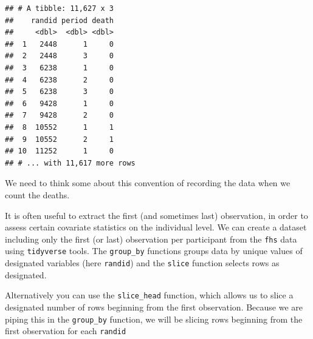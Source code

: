 \documentclass[
]{book}
\newenvironment{Shaded}{\begin{snugshade}}{\end{snugshade}}
\newcommand{\DataTypeTok}[1]{\textcolor[rgb]{0.13,0.29,0.53}{#1}}
\newcommand{\DecValTok}[1]{\textcolor[rgb]{0.00,0.00,0.81}{#1}}
\newcommand{\KeywordTok}[1]{\textcolor[rgb]{0.13,0.29,0.53}{\textbf{#1}}}
\newcommand{\NormalTok}[1]{#1}
\newcommand{\OperatorTok}[1]{\textcolor[rgb]{0.81,0.36,0.00}{\textbf{#1}}}
\newcommand{\StringTok}[1]{\textcolor[rgb]{0.31,0.60,0.02}{#1}}
\begin{document}
\begin{Shaded}
\end{Shaded}

\begin{verbatim}
## # A tibble: 11,627 x 3
##    randid period death
##     <dbl>  <dbl> <dbl>
##  1   2448      1     0
##  2   2448      3     0
##  3   6238      1     0
##  4   6238      2     0
##  5   6238      3     0
##  6   9428      1     0
##  7   9428      2     0
##  8  10552      1     1
##  9  10552      2     1
## 10  11252      1     0
## # ... with 11,617 more rows
\end{verbatim}

We need to think some about this convention of recording the data when we count
the deaths.

It is often useful to extract the first (and sometimes last) observation, in order to assess certain covariate statistics on the individual level. We can create a dataset including only the first (or last) observation per participant from the \texttt{fhs} data using \texttt{tidyverse} tools. The \texttt{group\_by} functions groups data by unique values of designated variables (here \texttt{randid}) and the \texttt{slice} function selects rows as designated.

\begin{Shaded}
\end{Shaded}

Alternatively you can use the \texttt{slice\_head} function, which allows us to slice a designated number of rows beginning from the first observation. Because we are piping this in the \texttt{group\_by} function, we will be slicing rows beginning from the first observation for each \texttt{randid}

\begin{Shaded}
\end{Shaded}
\end{document}
